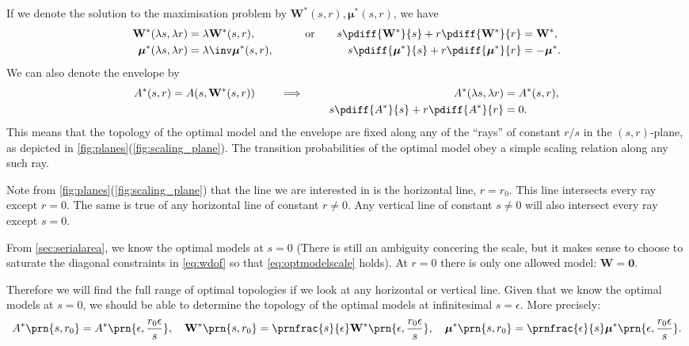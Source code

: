 \documentclass[12pt]{article}
\newcommand{\Wm}{W}
\newcommand{\W}{\mathbf{\Wm}}
\newcommand{\kktm}{\mu}
\newcommand{\kkt}{\boldsymbol{\kktm}}
\begin{document}
If we denote the solution to the maximisation problem by \(\W^\ast(s,r), \kkt^\ast(s,r)\), we have
%
\begin{equation}\label{eq:optmodelscale}
\begin{aligned}
  \W^\ast(\lambda s, \lambda r) &= \lambda \W^\ast(s,r), &
  \qquad \text{or} \qquad
  s \pdiff{\W^\ast}{s} + r \pdiff{\W^\ast}{r} &= \W^\ast, \\
  \kkt^\ast(\lambda s, \lambda r) &= \lambda\inv \kkt^\ast(s,r), &
  s \pdiff{\kkt^\ast}{s} + r \pdiff{\kkt^\ast}{r} &= -\kkt^\ast.
\end{aligned}
\end{equation}
%
We can also denote the envelope by
%
\begin{equation*}
  A^\ast(s,r) = A(s, \W^\ast(s,r))
  \qquad \implies \qquad
\begin{aligned}[t]
  A^\ast(\lambda s, \lambda r) &= A^\ast(s,r), \\
  s \pdiff{A^\ast}{s} + r \pdiff{A^\ast}{r} &= 0. \\
\end{aligned}
\end{equation*}
%
This means that the topology of the optimal model and the envelope are fixed along any of the ``rays'' of constant \(r/s\) in the \((s,r)\)-plane, as depicted in \cref{fig:planes}(\ref{fig:scaling_plane}). 
The transition probabilities of the optimal model obey a simple scaling relation along any such ray.

Note from \cref{fig:planes}(\ref{fig:scaling_plane}) that the line we are interested in is the horizontal line, \(r = r_0\).
This line intersects every ray except \(r = 0\).
The same is true of any horizontal line of constant \(r \neq 0\).
Any vertical line of constant \(s \neq 0\) will also intersect every ray except \(s = 0\).

From \cref{sec:serialarea}, we know the optimal models at \(s = 0\) (There is still an ambiguity concering the scale, but it makes sense to choose to saturate the diagonal constraints in \cref{eq:wdof} so that \cref{eq:optmodelscale} holds).
At \(r = 0\) there is only one allowed model: \(\W = \mathbf{0}\).

Therefore we will find the full range of optimal topologies if we look at any horizontal or vertical line.
Given that we know the optimal models at \(s = 0\), we should be able to determine the topology of the optimal models at infinitesimal \(s = \epsilon\).
More precisely:
%
\begin{equation}\label{eq:scaleopt}
  A^\ast\prn{s, r_0} = A^\ast\prn{\epsilon, \frac{r_0 \epsilon}{s}},
  \quad
  \W^\ast\prn{s, r_0} = \prnfrac{s}{\epsilon} \W^\ast\prn{\epsilon, \frac{r_0 \epsilon}{s}},
  \quad
  \kkt^\ast\prn{s, r_0} = \prnfrac{\epsilon}{s} \kkt^\ast\prn{\epsilon, \frac{r_0 \epsilon}{s}}.
\end{equation}
%
\end{document}
